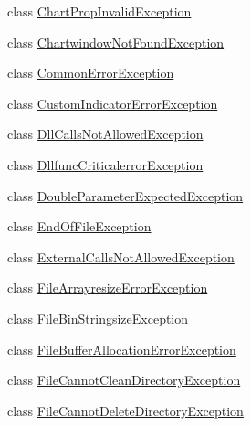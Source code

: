 \begin{DoxyCompactItemize}
\item 
class \hyperlink{class_m_q_l4_c_sharp_1_1_base_1_1_exceptions_1_1_chart_prop_invalid_exception}{Chart\+Prop\+Invalid\+Exception}
\item 
class \hyperlink{class_m_q_l4_c_sharp_1_1_base_1_1_exceptions_1_1_chartwindow_not_found_exception}{Chartwindow\+Not\+Found\+Exception}
\item 
class \hyperlink{class_m_q_l4_c_sharp_1_1_base_1_1_exceptions_1_1_common_error_exception}{Common\+Error\+Exception}
\item 
class \hyperlink{class_m_q_l4_c_sharp_1_1_base_1_1_exceptions_1_1_custom_indicator_error_exception}{Custom\+Indicator\+Error\+Exception}
\item 
class \hyperlink{class_m_q_l4_c_sharp_1_1_base_1_1_exceptions_1_1_dll_calls_not_allowed_exception}{Dll\+Calls\+Not\+Allowed\+Exception}
\item 
class \hyperlink{class_m_q_l4_c_sharp_1_1_base_1_1_exceptions_1_1_dllfunc_criticalerror_exception}{Dllfunc\+Criticalerror\+Exception}
\item 
class \hyperlink{class_m_q_l4_c_sharp_1_1_base_1_1_exceptions_1_1_double_parameter_expected_exception}{Double\+Parameter\+Expected\+Exception}
\item 
class \hyperlink{class_m_q_l4_c_sharp_1_1_base_1_1_exceptions_1_1_end_of_file_exception}{End\+Of\+File\+Exception}
\item 
class \hyperlink{class_m_q_l4_c_sharp_1_1_base_1_1_exceptions_1_1_external_calls_not_allowed_exception}{External\+Calls\+Not\+Allowed\+Exception}
\item 
class \hyperlink{class_m_q_l4_c_sharp_1_1_base_1_1_exceptions_1_1_file_arrayresize_error_exception}{File\+Arrayresize\+Error\+Exception}
\item 
class \hyperlink{class_m_q_l4_c_sharp_1_1_base_1_1_exceptions_1_1_file_bin_stringsize_exception}{File\+Bin\+Stringsize\+Exception}
\item 
class \hyperlink{class_m_q_l4_c_sharp_1_1_base_1_1_exceptions_1_1_file_buffer_allocation_error_exception}{File\+Buffer\+Allocation\+Error\+Exception}
\item 
class \hyperlink{class_m_q_l4_c_sharp_1_1_base_1_1_exceptions_1_1_file_cannot_clean_directory_exception}{File\+Cannot\+Clean\+Directory\+Exception}
\item 
class \hyperlink{class_m_q_l4_c_sharp_1_1_base_1_1_exceptions_1_1_file_cannot_delete_directory_exception}{File\+Cannot\+Delete\+Directory\+Exception}
\item 

\end{DoxyCompactItemize}
